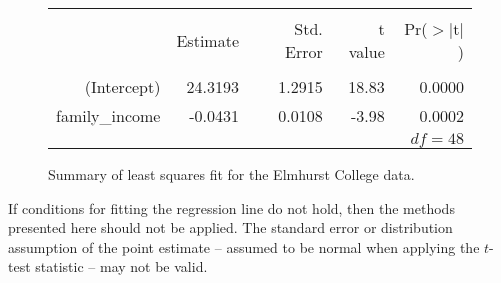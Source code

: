 \begin{figure}[ht]
\centering
\begin{tabular}{rrrrr}
  \hline
  \vspace{-3.7mm} & & & & \\
 & Estimate & Std. Error & t value & Pr($>$$|$t$|$) \\ 
  \hline
  \vspace{-3.6mm} & & & & \\
(Intercept) & 24.3193 & 1.2915 & 18.83 & 0.0000 \\ 
family\_\hspace{0.3mm}income & -0.0431 & 0.0108 & -3.98 & 0.0002 \\ 
   \hline
   \multicolumn{5}{r}{$df=48$} \\
\end{tabular}
\caption{Summary of least squares fit for the Elmhurst College data.}
\label{rOutputForIncomeAidLSRLineInInferenceSection}
\end{figure}

\begin{tipBox}{
If conditions for fitting the regression line do not hold, then the methods presented here should not be applied. The standard error or distribution assumption of the point estimate -- assumed to be normal when applying the $t$-test statistic -- may not be valid.}
\end{tipBox}



